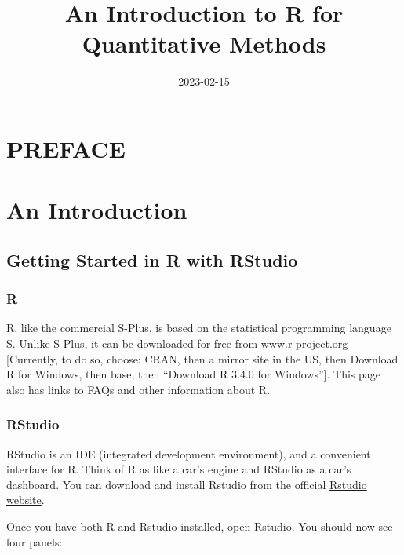 \documentclass[
]{book}
\title{An Introduction to R for Quantitative Methods}
\author{}
\date{\vspace{-2.5em}2023-02-15}
\begin{document}
\maketitle

{
\setcounter{tocdepth}{1}
\tableofcontents
}
\hypertarget{preface}{%
\chapter*{PREFACE}\label{preface}}

\hypertarget{an-introduction}{%
\chapter{An Introduction}\label{an-introduction}}

\hypertarget{getting-started-in-r-with-rstudio}{%
\section*{Getting Started in R with RStudio}\label{getting-started-in-r-with-rstudio}}

\hypertarget{r}{%
\subsection*{R}\label{r}}

R, like the commercial S-Plus, is based on the statistical programming language S. Unlike S-Plus, it can be downloaded for free from \url{www.r-project.org} {[}Currently, to do so, choose: CRAN, then a mirror site in the US, then Download R for Windows, then base, then ``Download R 3.4.0 for Windows''{]}. This page also has links to FAQs and other information about R.

\hypertarget{rstudio}{%
\subsection*{RStudio}\label{rstudio}}

RStudio is an IDE (integrated development environment), and a convenient interface for R. Think of R as like a car's engine and RStudio as a car's dashboard. You can download and install Rstudio from the official \href{https://rstudio.com/products/rstudio/download/}{Rstudio website}.

Once you have both R and Rstudio installed, open Rstudio. You should now see four panels:
\end{document}
